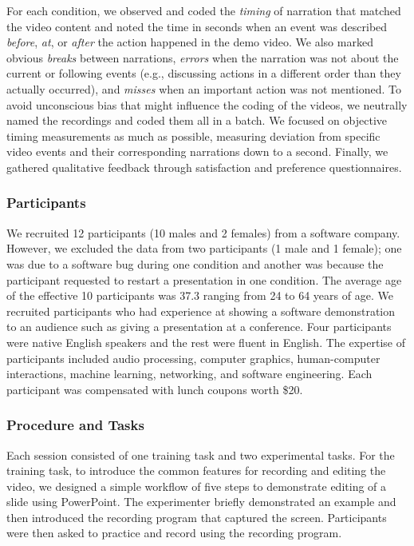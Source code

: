For each condition, we observed and coded the \textit{timing} of narration that matched the video content and noted the time in seconds when an event was described \textit{before}, \textit{at}, or \textit{after} the action happened in the demo video. We also marked obvious \textit{breaks} between narrations, \textit{errors} when the narration was not about the current or following events (e.g., discussing actions in a different order than they actually occurred), and \textit{misses} when an important action was not mentioned. To avoid unconscious bias that might influence the coding of the videos, we neutrally named the recordings and coded them all in a batch. We focused on objective timing measurements as much as possible, measuring deviation from specific video events and their corresponding narrations down to a second. Finally, we gathered qualitative feedback through satisfaction and preference questionnaires.

\subsubsection{Participants}
We recruited 12 participants (10 males and 2 females) from a software company. However, we excluded the data from two participants (1 male and 1 female); one was due to a software bug during one condition and another was because the participant requested to restart a presentation in one condition. The average age of the effective 10 participants was 37.3 ranging from 24 to 64 years of age. We recruited participants who had experience at showing a software demonstration to an audience such as giving a presentation at a conference. Four participants were native English speakers and the rest were fluent in English. The expertise of participants included audio processing, computer graphics, human-computer interactions, machine learning, networking, and software engineering. Each participant was compensated with lunch coupons worth \$20.

\subsubsection{Procedure and Tasks} Each session consisted of one training task and two experimental tasks. For the training task, to introduce the common features for recording and editing the video, we designed a simple workflow of five steps to demonstrate editing of a slide using PowerPoint. The experimenter briefly demonstrated an example and then introduced the recording program that captured the screen. Participants were then asked to practice and record using the recording program.


